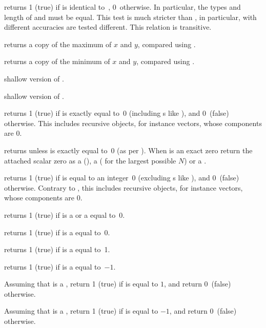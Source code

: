  returns 1 (true) if  is identical
to~, 0~otherwise. In particular, the types and length of  and
 must be equal. This test is much stricter than , in
particular,  with different accuracies are tested different. This
relation is transitive.

 returns a copy of the maximum of $x$ and $y$,
compared using .

 returns a copy of the minimum of $x$ and $y$,
compared using .

 shallow version of .

 shallow version of .


 returns 1 (true) if  is exactly equal
to~0 (including s like ), and 0~(false) otherwise.
This includes recursive objects, for instance vectors, whose components are $0$.

 returns  unless  is exactly
equal to~0 (as per ). When  is an exact zero
return the attached scalar zero as a  (),
a  ( for the largest possible $N$) or a
.

 returns 1 (true) if  is equal
to an integer~0 (excluding s like ), and 0~(false)
otherwise. Contrary to , this includes recursive objects, for
instance vectors, whose components are $0$.

 returns 1 (true) if  is a  or
a  equal to~0.

 returns 1 (true) if  is a 
equal to~0.

 returns 1 (true) if  is a 
equal to~1.

 returns 1 (true) if  is a 
equal to~$-1$.

Assuming that  is a , return 1 (true) if  is equal to
$1$, and return 0~(false) otherwise.

Assuming that  is a , return 1 (true) if  is equal to
$-1$, and return 0~(false) otherwise.

